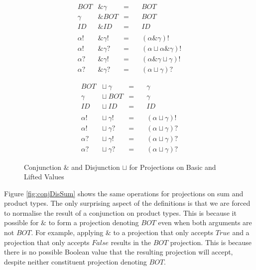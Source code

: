 \documentclass[preprint]{sigplanconf}
\DeclareMathOperator{\pmeet}{\&}
\begin{document}
\begin{figure}
\begin{multicols}{2}
\noindent

\begin{align*}
BOT       &\pmeet  \gamma        &=&\quad BOT \\
\gamma    &\pmeet  BOT           &=&\quad BOT \\
ID        &\pmeet  ID            &=&\quad ID \\
\quad &\             &\ &  \\
\alpha!        &\pmeet  \gamma!  &=&\quad (\alpha \pmeet \gamma)! \\
\alpha!        &\pmeet  \gamma?  &=&\quad (\alpha \sqcup \alpha \pmeet \gamma)! \\
\alpha?        &\pmeet  \gamma!  &=&\quad (\alpha \pmeet \gamma \sqcup \gamma)! \\
\alpha?        &\pmeet  \gamma?  &=&\quad (\alpha \sqcup \gamma)?
\end{align*}%

\begin{align*}
BOT            &\sqcup\  \gamma   &=&\quad \gamma \\
\gamma         &\sqcup\  BOT      &=&\quad \gamma \\
ID             &\sqcup\  ID       &=&\quad ID \\
\quad \ \quad  &                  &\ & \\
\alpha!        &\sqcup\  \gamma!  &=&\quad (\alpha \sqcup \gamma)! \\
\alpha!        &\sqcup\  \gamma?  &=&\quad (\alpha \sqcup \gamma)? \\
\alpha?        &\sqcup\  \gamma!  &=&\quad (\alpha \sqcup \gamma)? \\
\alpha?        &\sqcup\  \gamma?  &=&\quad (\alpha \sqcup \gamma)?
\end{align*}
\end{multicols}
\caption[Conjunction and Disjunction for Projections 1]{Conjunction $\pmeet$ and Disjunction $\sqcup$ for Projections on Basic and Lifted Values}
\label{fig:conjDisBasic}
\end{figure}

Figure \ref{fig:conjDisSum} shows the same operations for projections on sum
and product types. The only surprising aspect of the definitions is that we are
forced to normalise the result of a conjunction on product types. This is
because it possible for $\pmeet$ to form a projection denoting $BOT$ even when
both arguments are not $BOT$. For example, applying $\&$ to a projection that
only accepts $True$ and a projection that only accepts $False$ results in the
$BOT$ projection. This is because there is no possible Boolean value that the
resulting projection will accept, despite neither constituent projection
denoting $BOT$.
\end{document}
